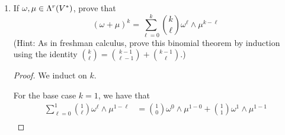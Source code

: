 \documentclass[../psets.tex]{subfiles}
\begin{document}
\begin{enumerate}[label={\textbf{1.6.\roman*.}}]
    \begin{equation*}
        \omega_1\wedge\omega_2 = (-1)^{rs}\omega_2\wedge\omega_1
    \end{equation*}
    \begin{proof}
        As per \textcite{bib:DifferentialForms}, it suffices to prove this claim for decomposable elements. As such, let $\omega_1=\ell_1\wedge\cdots\wedge\ell_r$ and let $\omega_2=\ell_1'\wedge\cdots\wedge\ell_s'$. Let $\sigma\in S_{r+s}$ be the permutation
        \begin{equation*}
            \sigma(x) =
            \begin{cases}
                x+s & x\leq r\\
                x-r & x>r
            \end{cases}
        \end{equation*}
        We can write $\sigma$ as a product of elementary transpositions in a systematic manner as follows.
        \begin{equation*}
            \sigma = \prod_{j=s-1}^0\prod_{i=1}^r\tau_{i+j,\,i+j+1}
        \end{equation*}
        Clearly, there are $rs$ of these transpositions, so $(-1)^\sigma=(-1)^{rs}$. Therefore, we have that
        \begin{align*}
            \omega_1\wedge\omega_2 &= (\ell_1\wedge\cdots\wedge\ell_r)\wedge(\ell_1'\wedge\cdots\wedge\ell_s')\\
            &= (-1)^\sigma(\ell_1'\wedge\cdots\wedge\ell_s')\wedge(\ell_1\wedge\cdots\wedge\ell_r)\\
            &= (-1)^{rs}\omega_2\wedge\omega_1
        \end{align*}
    \end{proof}
    \item If $\omega,\mu\in\lam[r]{V^*}$, prove that
    \begin{equation*}
        (\omega+\mu)^k = \sum_{\ell=0}^k\binom{k}{\ell}\omega^\ell\wedge\mu^{k-\ell}
    \end{equation*}
    (Hint: As in freshman calculus, prove this binomial theorem by induction using the identity $\binom{k}{\ell}=\binom{k-1}{\ell-1}+\binom{k-1}{\ell}$.)
    \begin{proof}
        We induct on $k$.\par
        For the base case $k=1$, we have that
        \begin{align*}
            \sum_{\ell=0}^1\binom{1}{\ell}\omega^\ell\wedge\mu^{1-\ell} &= \binom{1}{0}\omega^0\wedge\mu^{1-0}+\binom{1}{1}\omega^1\wedge\mu^{1-1}\\

\end{align*}
\end{proof}
\end{enumerate}
\end{document}
